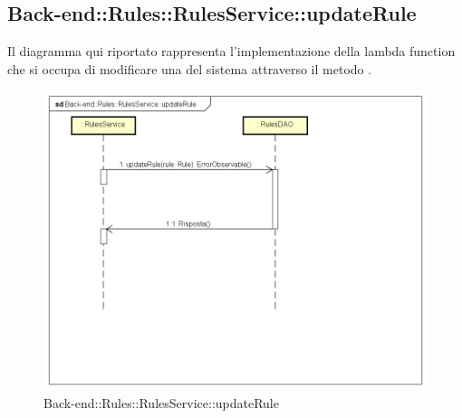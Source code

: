 \subsection{Back-end::Rules::RulesService::updateRule}
Il diagramma qui riportato rappresenta l'implementazione della lambda function che si occupa di modificare una  del sistema attraverso il metodo .
\begin{figure}[h] \centering \includegraphics[width=\textwidth,height=\textheight,keepaspectratio]{images/diagrams/back-end/Ufficial_Backend/Back-endRulesRulesServiceupdateRule.png} 	\caption{Back-end::Rules::RulesService::updateRule}
\end{figure}
\newpage


